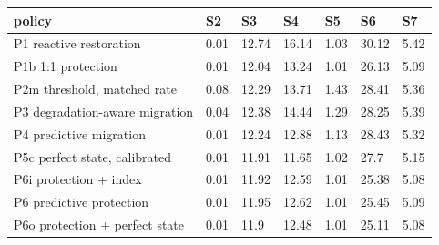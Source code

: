 \begin{tabular}{lllllll}
\toprule
policy & S2 & S3 & S4 & S5 & S6 & S7 \\
\midrule
P1 reactive restoration & 0.01 & 12.74 & 16.14 & 1.03 & 30.12 & 5.42 \\
P1b 1:1 protection & 0.01 & 12.04 & 13.24 & 1.01 & 26.13 & 5.09 \\
P2m threshold, matched rate & 0.08 & 12.29 & 13.71 & 1.43 & 28.41 & 5.36 \\
P3 degradation-aware migration & 0.04 & 12.38 & 14.44 & 1.29 & 28.25 & 5.39 \\
P4 predictive migration & 0.01 & 12.24 & 12.88 & 1.13 & 28.43 & 5.32 \\
P5c perfect state, calibrated & 0.01 & 11.91 & 11.65 & 1.02 & 27.7 & 5.15 \\
P6i protection + index & 0.01 & 11.92 & 12.59 & 1.01 & 25.38 & 5.08 \\
P6 predictive protection & 0.01 & 11.95 & 12.62 & 1.01 & 25.45 & 5.09 \\
P6o protection + perfect state & 0.01 & 11.9 & 12.48 & 1.01 & 25.11 & 5.08 \\
\bottomrule
\end{tabular}
